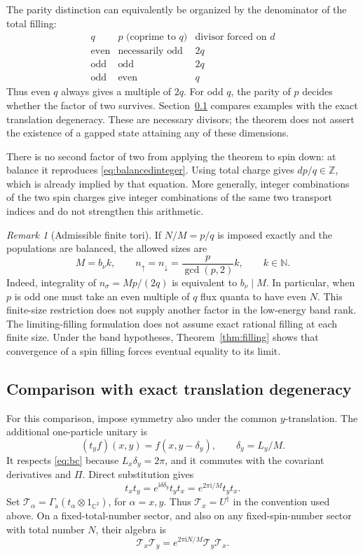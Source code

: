 \documentclass[11pt]{article}
\theoremstyle{definition}
\theoremstyle{remark}
\newtheorem{remark}[theorem]{Remark}
\newcommand{\ii}{\mathrm i}
\newcommand{\up}{\uparrow}
\newcommand{\dn}{\downarrow}
\begin{document}
The parity distinction can equivalently be organized by the
denominator of the total filling:
\[
\begin{array}{c|c|c}
 q & p\text{ (coprime to }q\text{)} & \text{divisor forced on }d\\ \hline
 \text{even}&\text{necessarily odd}&2q\\
 \text{odd}&\text{odd}&2q\\
 \text{odd}&\text{even}&q
\end{array}
\]
Thus even \(q\) always gives a multiple of \(2q\).  For odd
\(q\), the parity of \(p\) decides whether the factor of two
survives.  Section~\ref{sec:exacttranslation} compares examples
with the exact translation degeneracy.  These are necessary
divisors; the theorem does not assert the existence of a gapped
state attaining any of these dimensions.

There is no second factor of two from applying the theorem to
spin down: at balance it reproduces \eqref{eq:balancedinteger}.
Using total charge gives \(dp/q\in\mathbb Z\), which is already
implied by that equation.  More generally, integer combinations
of the two spin charges give integer combinations of the same
two transport indices and do not strengthen this arithmetic.

\begin{remark}[Admissible finite tori]\label{rem:finiteparity}
If \(N/M=p/q\) is imposed exactly and the populations are
balanced, the allowed sizes are
\[
 M=b_\nu k,\qquad
 n_\up=n_\dn=\frac{p}{\gcd(p,2)}k,
 \qquad k\in\mathbb N.
\]
Indeed, integrality of \(n_\sigma=Mp/(2q)\) is equivalent to
\(b_\nu\mid M\).  In particular, when \(p\) is odd one must
take an even multiple of \(q\) flux quanta to have even \(N\).
This finite-size restriction does not supply another factor in
the low-energy band rank.  The limiting-filling formulation
does not assume exact rational filling at each finite size.
Under the band hypotheses, Theorem~\ref{thm:filling} shows that
convergence of a spin filling forces eventual equality to its limit.
\end{remark}

\subsection{Comparison with exact translation degeneracy}
\label{sec:exacttranslation}

For this comparison, impose symmetry also under the common
\(y\)-translation.  The additional one-particle unitary is
\[
 (t_yf)(x,y)=f(x,y-\delta_y),\qquad \delta_y=L_y/M.
\]
It respects \eqref{eq:bc} because \(L_x\delta_y=2\pi\), and it
commutes with the covariant derivatives and \(\Pi\).
Direct substitution gives
\[
 t_xt_y=e^{\ii\delta\delta_y}t_yt_x
        =e^{2\pi\ii/M}t_yt_x.
\]
Set \(\mathcal T_\alpha=\Gamma_{\mathrm a}
(t_\alpha\otimes1_{\mathbb C^2})\), for \(\alpha=x,y\).
Thus \(\mathcal T_x=U^\dagger\) in the convention used above.
On a fixed-total-number sector, and also on any fixed-spin-number
sector with total number \(N\), their algebra is
\begin{equation}\label{eq:COMalgebra}
 \mathcal T_x\mathcal T_y
       =e^{2\pi\ii N/M}\mathcal T_y\mathcal T_x.
\end{equation}
\end{document}
